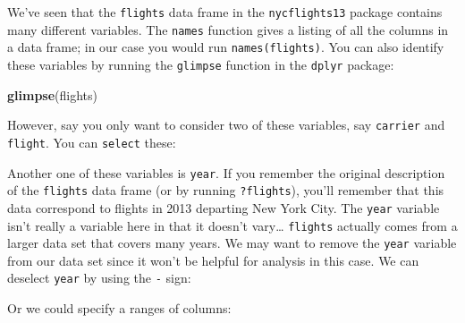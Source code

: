 \documentclass[]{tufte-book}
\newenvironment{Shaded}{\begin{snugshade}}{\end{snugshade}}
\newcommand{\KeywordTok}[1]{\textcolor[rgb]{0.13,0.29,0.53}{\textbf{{#1}}}}
\newcommand{\StringTok}[1]{\textcolor[rgb]{0.31,0.60,0.02}{{#1}}}
\newcommand{\NormalTok}[1]{{#1}}
\begin{document}
We've seen that the \texttt{flights} data frame in the
\texttt{nycflights13} package contains many different variables. The
\texttt{names} function gives a listing of all the columns in a data
frame; in our case you would run \texttt{names(flights)}. You can also
identify these variables by running the \texttt{glimpse} function in the
\texttt{dplyr} package:

\begin{Shaded}
\begin{Highlighting}[]
\KeywordTok{glimpse}\NormalTok{(flights)}
\end{Highlighting}
\end{Shaded}

However, say you only want to consider two of these variables, say
\texttt{carrier} and \texttt{flight}. You can \texttt{select} these:

\begin{Shaded}
\end{Shaded}

Another one of these variables is \texttt{year}. If you remember the
original description of the \texttt{flights} data frame (or by running
\texttt{?flights}), you'll remember that this data correspond to flights
in 2013 departing New York City. The \texttt{year} variable isn't really
a variable here in that it doesn't vary\ldots{} \texttt{flights}
actually comes from a larger data set that covers many years. We may
want to remove the \texttt{year} variable from our data set since it
won't be helpful for analysis in this case. We can deselect
\texttt{year} by using the \texttt{-} sign:

\begin{Shaded}
\end{Shaded}

Or we could specify a ranges of columns:

\begin{Shaded}
\end{Shaded}
\end{document}
